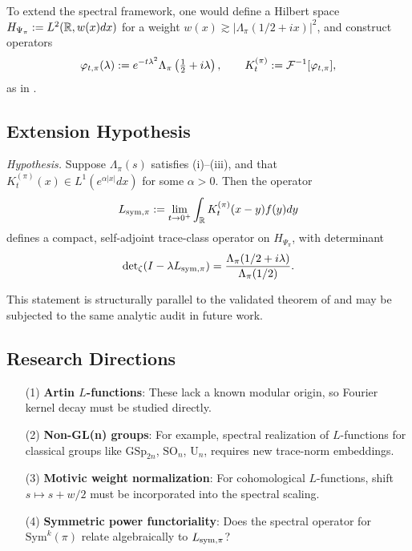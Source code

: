 To extend the spectral framework, one would define a Hilbert space \( H_{\Psi_\pi} := L^2(\mathbb{R}, w(x) dx) \) for a weight \( w(x) \gtrsim |\Lambda_\pi(1/2 + i x)|^2 \), and construct operators
\[
\varphi_{t,\pi}(\lambda) := e^{-t\lambda^2} \Lambda_\pi\left( \tfrac{1}{2} + i\lambda \right), \qquad K_t^{(\pi)} := \mathcal{F}^{-1}[\varphi_{t,\pi}],
\]
as in .

\subsection*{Extension Hypothesis}

\textit{Hypothesis.} Suppose \( \Lambda_\pi(s) \) satisfies (i)--(iii), and that \( K_t^{(\pi)}(x) \in L^1(e^{\alpha |x|} dx) \) for some \( \alpha > 0 \). Then the operator
\[
L_{\mathrm{sym},\pi} := \lim_{t \to 0^+} \int_{\mathbb{R}} K_t^{(\pi)}(x - y) f(y) dy
\]
defines a compact, self-adjoint trace-class operator on \( H_{\Psi_\pi} \), with determinant
\[
\det\nolimits_{\zeta}(I - \lambda L_{\mathrm{sym},\pi}) = \frac{\Lambda_\pi(1/2 + i\lambda)}{\Lambda_\pi(1/2)}.
\]

This statement is structurally parallel to the validated theorem of  and may be subjected to the same analytic audit in future work.

\subsection*{Research Directions}

\begin{itemize}
  \item[(1)] \textbf{Artin \( L \)-functions}: These lack a known modular origin, so Fourier kernel decay must be studied directly. 
  \item[(2)] \textbf{Non-GL(n) groups}: For example, spectral realization of \( L \)-functions for classical groups like \( \mathrm{GSp}_{2n} \), \( \mathrm{SO}_{n} \), \( \mathrm{U}_n \), requires new trace-norm embeddings.
  \item[(3)] \textbf{Motivic weight normalization}: For cohomological \( L \)-functions, shift \( s \mapsto s + w/2 \) must be incorporated into the spectral scaling.
  \item[(4)] \textbf{Symmetric power functoriality}: Does the spectral operator for \( \mathrm{Sym}^k(\pi) \) relate algebraically to \( L_{\mathrm{sym},\pi} \)?
\end{itemize}

